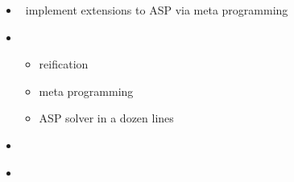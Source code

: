 \begin{frame}{\metasp}
  \begin{itemize}
  \item {} \ implement extensions to ASP via meta programming
  \item {} \
    \begin{itemize}
    \item reification
    \item meta programming
    \item ASP solver in a dozen lines
    \end{itemize}
  \item {}   \ \cite{gekasc11b,karoscwa21a}
  \item {} \ \cite{brderosc15b,digelurosc18a}
  \end{itemize}
\end{frame}
%
